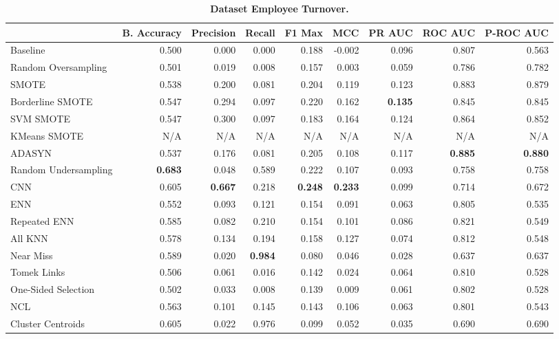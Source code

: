 \begin{table}[H]
    \centering
    \setlength\tabcolsep{2pt}
    \begin{tabularx}{\textwidth}{lRRRRRRRR}
        & B. Accuracy & Precision & Recall & F1 Max & MCC & PR AUC & ROC AUC & P-ROC AUC \\
        \midrule
        Baseline & 0.500 & 0.000 & 0.000 & 0.188 & -0.002 & 0.096 & 0.807 & 0.563 \\
        Random Oversampling & 0.501 & 0.019 & 0.008 & 0.157 & 0.003 & 0.059 & 0.786 & 0.782 \\
        SMOTE & 0.538 & 0.200 & 0.081 & 0.204 & 0.119 & 0.123 & 0.883 & 0.879 \\
        Borderline SMOTE & 0.547 & 0.294 & 0.097 & 0.220 & 0.162 & \textbf{0.135} & 0.845 & 0.845 \\
        SVM SMOTE & 0.547 & 0.300 & 0.097 & 0.183 & 0.164 & 0.124 & 0.864 & 0.852 \\
        KMeans SMOTE & N/A & N/A & N/A & N/A & N/A & N/A & N/A & N/A \\
        ADASYN & 0.537 & 0.176 & 0.081 & 0.205 & 0.108 & 0.117 & \textbf{0.885} & \textbf{0.880} \\
        Random Undersampling & \textbf{0.683} & 0.048 & 0.589 & 0.222 & 0.107 & 0.093 & 0.758 & 0.758 \\
        CNN & 0.605 & \textbf{0.667} & 0.218 & \textbf{0.248} & \textbf{0.233} & 0.099 & 0.714 & 0.672 \\
        ENN & 0.552 & 0.093 & 0.121 & 0.154 & 0.091 & 0.063 & 0.805 & 0.535 \\
        Repeated ENN & 0.585 & 0.082 & 0.210 & 0.154 & 0.101 & 0.086 & 0.821 & 0.549 \\
        All KNN & 0.578 & 0.134 & 0.194 & 0.158 & 0.127 & 0.074 & 0.812 & 0.548 \\
        Near Miss & 0.589 & 0.020 & \textbf{0.984} & 0.080 & 0.046 & 0.028 & 0.637 & 0.637 \\
        Tomek Links & 0.506 & 0.061 & 0.016 & 0.142 & 0.024 & 0.064 & 0.810 & 0.528 \\
        One-Sided Selection & 0.502 & 0.033 & 0.008 & 0.139 & 0.009 & 0.061 & 0.802 & 0.528 \\
        NCL & 0.563 & 0.101 & 0.145 & 0.143 & 0.106 & 0.063 & 0.801 & 0.543 \\
        Cluster Centroids & 0.605 & 0.022 & 0.976 & 0.099 & 0.052 & 0.035 & 0.690 & 0.690 \\
    \end{tabularx}
    \vspace{1mm}
    \caption{\textbf{Dataset Employee Turnover.}}
\end{table}
